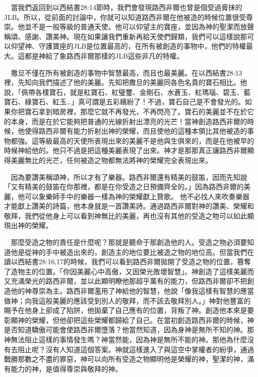 \documentclass{book}
\begin{document}
　當我們返回到以西結書28:14節時，我們會發現路西非爾也曾是個受過膏抹的JLB。所以，從前面的討論中，你就可以知道路西非爾在他被造的時候位置很受尊崇。他並不是一般等級的普通天使。他可以仰望主的寶座，並因為神的聖潔而放聲稱頌、感謝、讚美神。現在如果讓我們重新再給天使們歸類，我們可以這樣說那可以仰望神、守護寶座的JLB是位置最高的，在所有被創造的事物中，他們的特權最大。這都是神給了象路西非爾那樣的JLB這些非凡的特權。

　撒旦不僅在所有被創造的事物中智慧最高，而且也最美麗。在以西結書28:13裡，先知向我們描述了他的美麗。先知把撒旦的美麗同各色名貴的寶石相比。他說，「佩帶各樣寶石，就是紅寶石、紅璧璽、金剛石、水蒼玉、紅瑪瑙、碧玉、藍寶石、綠寶石、紅玉…」真可謂是五彩繽紛了！不過，寶石自己是不會發光的。如果你把寶石拿到暗房裡，那麼它就不再發光，不再閃亮了。寶石的美麗並不在於它的本身，而是在於它能夠把普通的光線折射出漂亮的光芒！當神創造路西非爾的時候，他使得路西非爾有能力折射出神的榮耀，而且使他的這種本領比其他被造的事物都強。這等級最高的天使所表現出來的美麗不是他與生俱來的，而是在他被早的時候神給他的。他只不過是把這種美麗表現了出來。神才是那那真正讓路西非爾顯得美麗無比的光芒，任何被造之物都無法將神的榮耀完全表現出來。

　因為要讚美稱頌神，所以才有了樂器。路西非爾還有精美的鼓笛，因而先知說「又有精美的鼓笛在你那裡，都是在你受造之日預備齊全的。」因為路西非爾的美麗，他可以象樂師手中的樂器一樣為神的榮耀獻上贊歌。 他不必找人來吹奏樂器才能獻上讚美的詩篇，他本身就是一首讚美詩。通過路西非爾對神的讚美、榮耀和敬拜，我們從他身上可以看到神無比的美麗，再也沒有其他的受造之物可以如此顯現出神的榮耀。

　那麼受造之物的責任是什麼呢？那就是聽命于那創造他的人。受造之物必須要知道他是從神的手中被造出來的，創造主的地位要比被造之物的地位高。但當我們在讀以西結書28:16,17的時候，我們可以看到路西非爾拋開了受造之物的位置，篡奪了造物主的位置。「你因美麗心中高傲，又因榮光敗壞智慧」。神創造了這樣美麗而又充滿榮光的路西非爾，並以此顯明瞭他那超乎萬有的能力，但路西非爾卻不把創造他的神尊崇為主。路西非爾濫用了神給他的智慧，他說「像我這樣有智慧的應當做神；向我這般美麗的應該受到別人的敬拜，而不該去敬拜別人。」神對他豐富的賜予在他身上卻成了陷阱，他拋棄了自己應有的位置，背叛了神。創造他本來是要彰顯神的榮耀，但他卻把這些榮耀都歸給了自己。在當初創造路西非爾的時候，神是否知道驕傲可能會使路西非爾墮落？他當然知道，因為身神是無所不知的神。那神無法阻止這樣的事情發生嗎？神當然能，因為神是無所不能的神。那他為什麼沒有去阻止呢？沒有人知道這個答案。神就這樣進入了與這空中掌權者的紛爭，通過戰勝那數之不盡的罪惡，神可以向所有受造之物顯明他是榮耀的神，聖潔的神，滿有能力的神，是值得尊崇與敬拜的神。
\end{document}
